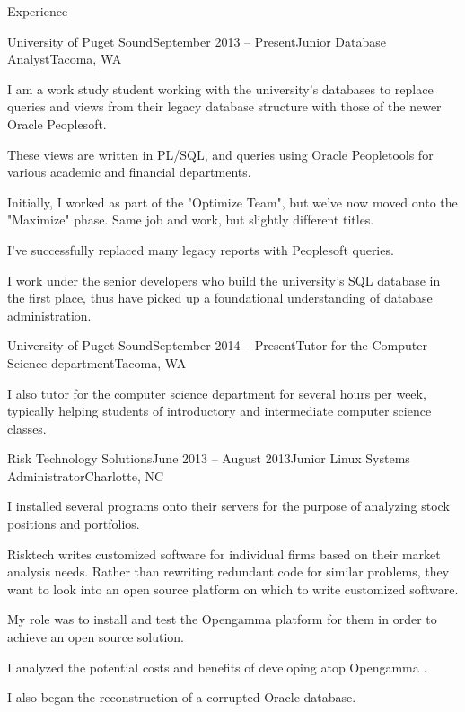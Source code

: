 \documentclass{resume} %
\begin{document}
\begin{rSection}{Experience} 

\begin{rSubsection}{University of Puget Sound}{September 2013 -- Present}{Junior Database Analyst}{Tacoma, WA}

\item I am a work study student working with the university's databases to replace queries and views from their legacy database structure with those of the newer Oracle Peoplesoft.
\item These views are written in PL/SQL, and queries using Oracle Peopletools for various academic and financial departments.
\item Initially, I worked as part of the "Optimize Team", but we've now moved onto the "Maximize" phase. Same job and work, but slightly dif$\mathit{}$ferent titles. 
\item I've successfully replaced many legacy reports with Peoplesoft queries. 
\item I work under the senior developers who build the university's SQL database in the first place, thus have picked up a foundational understanding of database administration.


\end{rSubsection}


\begin{rSubsection}{University of Puget Sound}{September 2014 -- Present}{Tutor for the Computer Science department}{Tacoma, WA}
\item I also tutor for the computer science department for several hours per week, typically helping students of introductory and intermediate computer science classes.
\end{rSubsection}


\begin{rSubsection}{Risk Technology Solutions}{June 2013 -- August 2013}{Junior Linux Systems Administrator}{Charlotte, NC}
\item I installed several programs onto their servers for the purpose of analyzing stock positions and portfolios. 
\item Risktech writes customized software for individual firms based on their market analysis needs. Rather than rewriting redundant code for similar problems, they want to look into an open source platform on which to write customized software. 
\item My role was to install and test the Opengamma platform for them in order to achieve an open source solution. 
\item I analyzed the potential costs and benefits of developing atop Opengamma .
\item I also began the reconstruction of a corrupted Oracle database.
\end{rSubsection}


\end{rSection}
\end{document}
